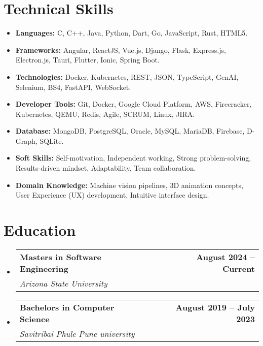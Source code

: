 \documentclass[letterpaper,11pt]{article}
\makeatletter
\newcommand{\resumeItem}[1]{
  \item\small{
    {#1 \vspace{-2pt}}
  }
}
\newcommand{\resumeSubheading}[4]{
  \vspace{-2pt}\item
    \begin{tabular*}{0.97\textwidth}[t]{l@{\extracolsep{\fill}}r}
      \textbf{\small#1} & \textbf{\small#2} \\
      \textit{\small#3} & \textit{\small#4} \\
    \end{tabular*}\vspace{-7pt}
}
\newcommand{\resumeSubItem}[1]{\resumeItem{#1}\vspace{-4pt}}
\newcommand{\resumeSubHeadingListStart}{\begin{itemize}[leftmargin=0.15in, label={}]}
\newcommand{\resumeSubHeadingListEnd}{\end{itemize}}
\makeatother
\begin{document}
\section{Technical Skills}
\resumeSubHeadingListStart
  \resumeSubItem{\textbf{Languages:} C, C++, Java, Python, Dart, Go, JavaScript, Rust, HTML5.}
  \resumeSubItem{\textbf{Frameworks:} Angular, ReactJS, Vue.js, Django, Flask, Express.js, Electron.js, Tauri, Flutter, Ionic, Spring Boot.}
  \resumeSubItem{\textbf{Technologies:} Docker, Kubernetes, REST, JSON, TypeScript, GenAI, Selenium, BS4, FastAPI, WebSocket.}
  \resumeSubItem{\textbf{Developer Tools:} Git, Docker, Google Cloud Platform, AWS, Firecracker, Kubernetes, QEMU, Redis, Agile, SCRUM, Linux, JIRA.}
  \resumeSubItem{\textbf{Database:} MongoDB, PostgreSQL, Oracle, MySQL, MariaDB, Firebase, D-Graph, SQLite.}
  \resumeSubItem{\textbf{Soft Skills:} Self-motivation, Independent working, Strong problem-solving, Results-driven mindset, Adaptability, Team collaboration.}
  \resumeSubItem{\textbf{Domain Knowledge:} Machine vision pipelines, 3D animation concepts, User Experience (UX) development, Intuitive interface design.}
\resumeSubHeadingListEnd

\section{Education}
  \resumeSubHeadingListStart
    \resumeSubheading
      {Masters in Software Engineering}{August 2024 -- Current}
      {Arizona State University}{}
    \resumeSubheading
      {Bachelors in Computer Science}{August 2019 -- July 2023}
      {Savitribai Phule Pune university}{}
  \resumeSubHeadingListEnd
\end{document}
